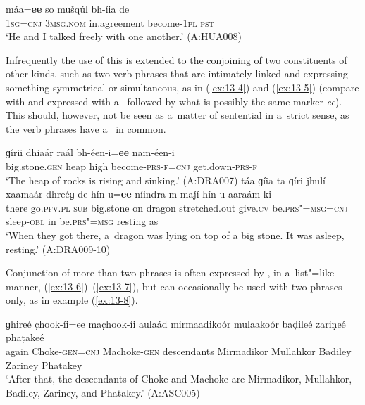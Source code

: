 \ex
\label{ex:13-3}
\gll {\ob}máa=\textbf{ee} so{\cb} mušqúl bh-íia de  \\
\textsc{1sg}=\textsc{cnj} \textsc{3msg.nom} in.agreement become-\textsc{1pl} \textsc{pst} \\
\glt `He and I talked freely with one another.' (A:HUA008) 
\z

Infrequently the use of this  is extended to the conjoining of two constituents of other kinds, such as two verb phrases that are intimately linked and expressing something symmetrical or simultaneous, as in (\ref{ex:13-4}) and (\ref{ex:13-5}) (compare with  and  expressed with a~ followed by what is possibly the same marker \textit{ee}). This should, however, not be seen as a~matter of sentential  in a~strict sense, as the verb phrases have a~ in common.

\ea
\label{ex:13-4}
\gll ɡírii dhiaáṛ {\ob}raál bh-éen-i=\textbf{ee} nam-éen-i{\cb}  \\
big.stone.\textsc{gen} heap high become-\textsc{prs-f=cnj} get.down-\textsc{prs-f}  \\
\glt `The heap of rocks is rising and sinking.' (A:DRA007) 
\ex
\label{ex:13-5}
\gll táa ɡíia ta ɡíri ǰhulí xaamaár {\ob}dhreéɡ de hín-u=\textbf{ee} níindra-m maǰí hín-u{\cb} aaraám ki\\
there go.\textsc{pfv.pl} \textsc{sub} big.stone on dragon stretched.out  give.\textsc{cv} be.\textsc{prs"=msg=cnj} sleep-\textsc{obl} in be.\textsc{prs"=msg}  resting as\\
\glt `When they got there, a~dragon was lying on top of a big stone. It was asleep, resting.' (A:DRA009-10) 
\z

 Conjunction of more than two  phrases is often expressed by , in a~list"=like manner, (\ref{ex:13-6})--(\ref{ex:13-7}), but can occasionally be used with two  phrases only, as in example (\ref{ex:13-8}).

\ea
\label{ex:13-6}
\gll ɡhireé c̣hook-íi=ee mac̣hook-íi aulaád {\ob}mirmaadikoór mulaakoór baḍileé zariṇeé phaṭakeé{\cb}\\
again Choke-\textsc{gen=cnj} Machoke-\textsc{gen} descendants  Mirmadikor Mullahkor Badiley Zariney Phatakey \\
\glt `After that, the descendants of Choke and Machoke are Mirmadikor, Mullahkor, Badiley, Zariney, and Phatakey.' (A:ASC005)

